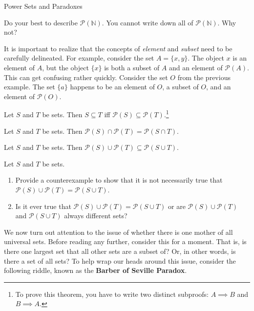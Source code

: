 \begin{section}{Power Sets and Paradoxes}
\begin{exercise}
Do your best to describe $\mathcal{P}(\mathbb{N})$.  You cannot write down all of $\mathcal{P}(\mathbb{N})$.  Why not?
\end{exercise}

\begin{remark}
It is important to realize that the concepts of \emph{element} and \emph{subset} need to be carefully delineated.  For example, consider the set $A=\{x,y\}$.  The object $x$ is an element of $A$, but the object $\{x\}$ is both a subset of $A$ and an element of $\mathcal{P}(A)$.  This can get confusing rather quickly.  Consider the set $O$ from the previous example.  The set $\{a\}$ happens to be an element of $O$, a subset of $O$, and an element of  $\mathcal{P}(O)$.
\end{remark}

\begin{theorem}[*]
Let $S$ and $T$ be sets.  Then $S\subseteq T$ iff $\mathcal{P}(S)\subseteq \mathcal{P}(T)$.\footnote{To prove this theorem, you have to write two distinct subproofs: $A\implies B$ and $B\implies A$.}
\end{theorem}

\begin{theorem}[*]
Let $S$ and $T$ be sets.  Then $\mathcal{P}(S)\cap\mathcal{P}(T)=\mathcal{P}(S\cap T)$.
\end{theorem}

\begin{theorem}[*]
Let $S$ and $T$ be sets.  Then $\mathcal{P}(S)\cup\mathcal{P}(T)\subseteq \mathcal{P}(S\cup T)$.
\end{theorem}


\begin{exercise}
Let $S$ and $T$ be sets.
\begin{enumerate}
\item Provide a counterexample to show that it is not necessarily true that $\mathcal{P}(S)\cup\mathcal{P}(T)= \mathcal{P}(S\cup T)$.
\item Is it ever true that $\mathcal{P}(S)\cup\mathcal{P}(T)= \mathcal{P}(S\cup T)$ or are $\mathcal{P}(S)\cup\mathcal{P}(T)$ and $\mathcal{P}(S\cup T)$ always different sets?
\end{enumerate}
\end{exercise}

We now turn out attention to the issue of whether there is one mother of all universal sets.  Before reading any further, consider this for a moment.  That is, is there one largest set that all other sets are a subset of?  Or, in other words, is there a set of all sets?  To help wrap our heads around this issue, consider the following riddle, known as the \textbf{Barber of Seville Paradox}.


\end{section}
